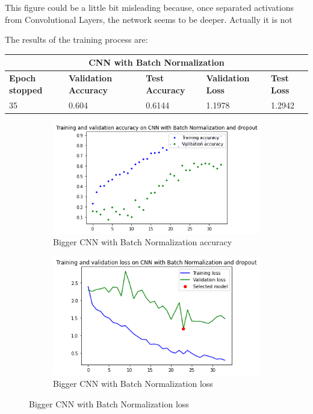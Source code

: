 \noindent This figure could be a little bit misleading because, once separated activations from Convolutional Layers, the network seems to be deeper. Actually it is not

\noindent The results of the training process are: 

\medskip

\begin{tabular}{ |p{2cm}|p{2cm}|p{2cm}|p{2cm}|p{2cm}|  }
\hline
\multicolumn{5}{|c|}{CNN with Batch Normalization} \\
\hline
\textbf{Epoch stopped} & \textbf{Validation Accuracy} & \textbf{Test Accuracy} & \textbf{Validation Loss} & \textbf{Test Loss} \\
\hline
35 & 0.604 & 0.6144 & 1.1978 & 1.2942\\
\hline
\end{tabular}

\medskip


\begin{figure}[H]
	\begin{subfigure}{0.5\textwidth}
		\includegraphics[width=0.9\linewidth]{img/scratch/batch_normalization_acc.png} 
		\caption{Bigger CNN with Batch Normalization accuracy}
		\label{fig:BatchNormalizationacc}
	\end{subfigure}
	\begin{subfigure}{0.5\textwidth}
		\includegraphics[width=0.9\linewidth]{img/scratch/batch_normalization_loss.png}
		\caption{Bigger CNN with Batch Normalization loss}
		\label{fig:BatchNormalizationloss}
	\end{subfigure}
\end{figure}

